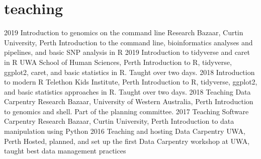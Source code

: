 \documentclass[]{friggeri-cv} %
\begin{document}
\section{teaching}

\begin{entrylist}
\entry
{2019}
{Introduction to genomics on the command line}
{Research Bazaar, Curtin University, Perth}
{Introduction to the command line, bioinformatics analyses and pipelines, and basic SNP analysis in R}
\entry
{2019}
{Introduction to tidyverse and caret in R}
{UWA School of Human Sciences, Perth}
{Introduction to R, tidyverse, ggplot2, caret, and basic statistics in R. Taught over two days.}
\entry
{2018}
{Introduction to modern R}
{Telethon Kids Institute, Perth}
{Introduction to R, tidyverse, ggplot2, and basic statistics approaches in R. Taught over two days.}
\entry
{2018}
{Teaching Data Carpentry}
{Research Bazaar, University of Western Australia, Perth}
{Introduction to genomics and shell. Part of the planning committee.}
\entry
{2017}
{Teaching Software Carpentry}
{Research Bazaar, Curtin University, Perth}
{Introduction to data manipulation using Python}
\entry
{2016}
{Teaching and hosting Data Carpentry}
{UWA, Perth}
{Hosted, planned, and set up the first Data Carpentry workshop at UWA, taught best data management practices}
\end{entrylist}
\end{document}
